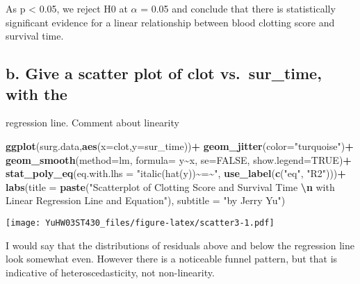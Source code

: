 \documentclass[
]{article}
\newenvironment{Shaded}{\begin{snugshade}}{\end{snugshade}}
\newcommand{\AttributeTok}[1]{\textcolor[rgb]{0.13,0.29,0.53}{#1}}
\newcommand{\ConstantTok}[1]{\textcolor[rgb]{0.56,0.35,0.01}{#1}}
\newcommand{\FunctionTok}[1]{\textcolor[rgb]{0.13,0.29,0.53}{\textbf{#1}}}
\newcommand{\NormalTok}[1]{#1}
\newcommand{\SpecialCharTok}[1]{\textcolor[rgb]{0.81,0.36,0.00}{\textbf{#1}}}
\newcommand{\StringTok}[1]{\textcolor[rgb]{0.31,0.60,0.02}{#1}}
\begin{document}
As p \textless{} 0.05, we reject H0 at \(\alpha\) = 0.05 and conclude
that there is statistically significant evidence for a linear
relationship between blood clotting score and survival time.

\hypertarget{b.-give-a-scatter-plot-of-clot-vs.-sur_time-with-the}{%
\subsection{b. Give a scatter plot of clot vs.~sur\_time, with
the}\label{b.-give-a-scatter-plot-of-clot-vs.-sur_time-with-the}}

regression line. Comment about linearity

\begin{Shaded}
\begin{Highlighting}[]
\FunctionTok{ggplot}\NormalTok{(surg.data,}\FunctionTok{aes}\NormalTok{(}\AttributeTok{x=}\NormalTok{clot,}\AttributeTok{y=}\NormalTok{sur\_time))}\SpecialCharTok{+}
  \FunctionTok{geom\_jitter}\NormalTok{(}\AttributeTok{color=}\StringTok{"turquoise"}\NormalTok{)}\SpecialCharTok{+}
  \FunctionTok{geom\_smooth}\NormalTok{(}\AttributeTok{method=}\StringTok{\textquotesingle{}lm\textquotesingle{}}\NormalTok{, }\AttributeTok{formula=}\NormalTok{ y}\SpecialCharTok{\textasciitilde{}}\NormalTok{x,}
              \AttributeTok{se=}\ConstantTok{FALSE}\NormalTok{,}
              \AttributeTok{show.legend=}\ConstantTok{TRUE}\NormalTok{)}\SpecialCharTok{+}
    \FunctionTok{stat\_poly\_eq}\NormalTok{(}\AttributeTok{eq.with.lhs =} \StringTok{"italic(hat(y))\textasciitilde{}\textasciigrave{}=\textasciigrave{}\textasciitilde{}"}\NormalTok{,}
               \FunctionTok{use\_label}\NormalTok{(}\FunctionTok{c}\NormalTok{(}\StringTok{"eq"}\NormalTok{, }\StringTok{"R2"}\NormalTok{)))}\SpecialCharTok{+}
  \FunctionTok{labs}\NormalTok{(}\AttributeTok{title =} \FunctionTok{paste}\NormalTok{(}\StringTok{"Scatterplot of Clotting Score and Survival Time }\SpecialCharTok{\textbackslash{}n}\StringTok{ with Linear Regression Line and Equation"}\NormalTok{),}
         \AttributeTok{subtitle =} \StringTok{"by Jerry Yu"}\NormalTok{)}
\end{Highlighting}
\end{Shaded}

\texttt{[image: YuHW03ST430\_files/figure-latex/scatter3-1.pdf]}

I would say that the distributions of residuals above and below the
regression line look somewhat even. However there is a noticeable funnel
pattern, but that is indicative of heteroscedasticity, not
non-linearity.
\end{document}
